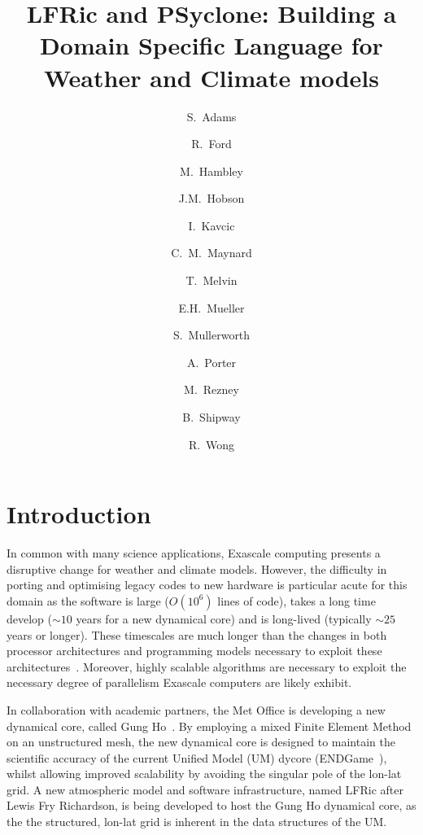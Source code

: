 \documentclass[times]{elsarticle}
\begin{document}
\begin{frontmatter}

\title{LFRic and PSyclone: Building a Domain Specific Language for Weather and Climate models}

\author[met]{S.~Adams}
\author[hartree]{R.~Ford}
\author[met]{M.~Hambley}
\author[met]{J.M.~Hobson}
\author[met]{I.~Kavcic}
\author[met,read]{C.~M.~Maynard}
\author[met]{T.~Melvin}
\author[bath]{E.H.~Mueller}
\author[met]{S.~Mullerworth}
\author[hartree]{A.~Porter}
\author[downunder]{M.~Rezney}
\author[met]{B.~Shipway}
\author[met]{R.~Wong}




\address[met]{Met Office, FitzRoy Road, Exeter, EX1 3PB}
\address[read]{Department of Computer Science, Polly Vacher Building,
  University of Reading, Reading, UK, RG6 6AY}
\address[bath]{Department of Mathematics, University of Bath, Bath}
\address[downunder]{University of Monash, Melbourne, Australia}
\address[hartree]{Hartree Centre, STFC Daresbury, Grim up North}

\begin{abstract}
\end{abstract}

\begin{keyword}

\end{keyword}

\end{frontmatter}

\section{Introduction}
In common with many science applications, Exascale computing presents
a disruptive change for weather and climate models. However, the
difficulty in porting and optimising legacy codes to new hardware is
particular acute for this domain as the software is large ($O(10^6)$
lines of code), takes a long time develop ($\sim 10$ years for a new
dynamical core) and is long-lived (typically $\sim 25$ years or longer). These
timescales are much longer than the changes in both processor
architectures and programming models necessary to exploit these
architectures~\cite{gmd-2017-186}. Moreover, highly scalable
algorithms are necessary to exploit the necessary degree of
parallelism Exascale computers are likely exhibit.

In collaboration with academic partners, the Met Office is developing
a new dynamical core, called Gung Ho~\cite{MELVIN2018342}. By
employing a mixed Finite Element Method on an unstructured mesh, the
new dynamical core is designed to maintain the scientific accuracy of
the current Unified Model (UM) dycore (ENDGame~\cite{QJ:QJ2235}),
whilst allowing improved scalability by avoiding the singular pole of
the lon-lat grid. A new atmospheric model and software infrastructure,
named LFRic after Lewis Fry Richardson, is being developed to host the
Gung Ho dynamical core, as the the structured, lon-lat grid is inherent in the
data structures of the UM.
\end{document}
